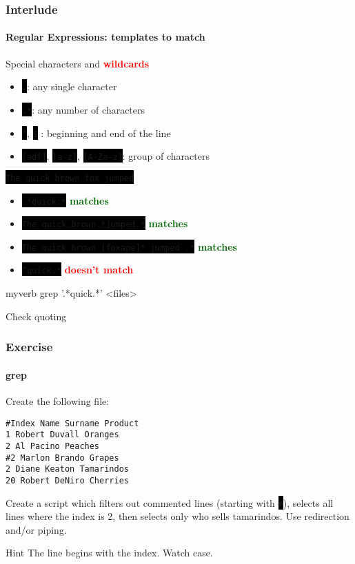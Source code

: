 \documentclass[unknownkeysallowed, 10pt, a4 paper, handout]{beamer}
\newcommand{\green}[1]{\textbf{\textcolor{darkgreen}{#1}}}
\newcommand{\red}[1]{\textbf{\textcolor{red}{#1}}}
\newcommand{\focus}[1]{\textbf{\textcolor{red}{#1}}}
\newcommand{\code}[1]{\colorbox{black}{\color{green}\texttt{#1}}}
\newcommand{\codeine}[1]{\colorbox{black}{\color{green}\BUseVerbatim{#1}}}
\begin{document}
\begin{frame}[fragile=singleslide]
  \frametitle{Interlude}
  \framesubtitle{Regular Expressions: templates to match}

  \footnotesize{
    \begin{exampleblock}{}
    Special characters and \focus{wildcards}
    \begin{itemize}
      \item \code{.}: any single character
      \item \code{.*}: any number of characters
      \item \code{\^}, \code{\$} : beginning and end of the line
      \item \code{[adf]}, \code{[a-z]}, \code{[A-Za-z]}: group of characters
    \end{itemize}
  \end{exampleblock}

    \begin{exampleblock}{}
    \code{The quick brown fox jumped}
    \begin{itemize}
      \item \code{.*quick.*} \green{matches}
      \item \code{The quick brown.*jumped.*} \green{matches}
      \item \code{The quick brown [foxape]* jumped .*} \green{matches}
      \item \code{\^{}quick.*} \red{doesn't match}
    \end{itemize}
  \end{exampleblock}

  \begin{SaveVerbatim}{myverb}
grep '.*quick.*' <files>
  \end{SaveVerbatim}
  \begin{alertblock}{Check quoting}
    \codeine{myverb}
  \end{alertblock}
  }
\end{frame}

\begin{frame}[fragile=singleslide]
  \frametitle{Exercise}
  \framesubtitle{grep}

  \begin{block}{}
    Create the following file:
    \begin{verbatim}
#Index Name Surname Product
1 Robert Duvall Oranges
2 Al Pacino Peaches
#2 Marlon Brando Grapes
2 Diane Keaton Tamarindos
20 Robert DeNiro Cherries
    \end{verbatim}
  \end{block}

  \begin{exampleblock}{}
    Create a script which filters out commented lines (starting with
    \code{\#}), selects all lines where the index is 2, then selects only who
    sells tamarindos. Use redirection and/or piping.
  \end{exampleblock}

  \begin{alertblock}{Hint}
    The line begins with the index. Watch case.
  \end{alertblock}
\end{frame}
\end{document}
